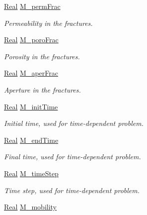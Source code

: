 \begin{DoxyCompactItemize}
\hyperlink{namespaceFVCode3D_a40c1f5588a248569d80aa5f867080e83}{Real} \hyperlink{classFVCode3D_1_1Data_a68f9fa864f076c053ae8ac8a3f86f7ea}{M\+\_\+perm\+Frac}
\begin{DoxyCompactList}\small\item\em Permeability in the fractures. \end{DoxyCompactList}\item 
\hyperlink{namespaceFVCode3D_a40c1f5588a248569d80aa5f867080e83}{Real} \hyperlink{classFVCode3D_1_1Data_af95b239d77dd531aaa59e3ac891dbd71}{M\+\_\+poro\+Frac}
\begin{DoxyCompactList}\small\item\em Porosity in the fractures. \end{DoxyCompactList}\item 
\hyperlink{namespaceFVCode3D_a40c1f5588a248569d80aa5f867080e83}{Real} \hyperlink{classFVCode3D_1_1Data_abf85bba32b4b3bdc3a392f193d4a145d}{M\+\_\+aper\+Frac}
\begin{DoxyCompactList}\small\item\em Aperture in the fractures. \end{DoxyCompactList}\item 
\hyperlink{namespaceFVCode3D_a40c1f5588a248569d80aa5f867080e83}{Real} \hyperlink{classFVCode3D_1_1Data_ab4a94e00bef44eb2195783ffa4682cf0}{M\+\_\+init\+Time}
\begin{DoxyCompactList}\small\item\em Initial time, used for time-\/dependent problem. \end{DoxyCompactList}\item 
\hyperlink{namespaceFVCode3D_a40c1f5588a248569d80aa5f867080e83}{Real} \hyperlink{classFVCode3D_1_1Data_ad0db1011dedc7485e6b4393c872506c0}{M\+\_\+end\+Time}
\begin{DoxyCompactList}\small\item\em Final time, used for time-\/dependent problem. \end{DoxyCompactList}\item 
\hyperlink{namespaceFVCode3D_a40c1f5588a248569d80aa5f867080e83}{Real} \hyperlink{classFVCode3D_1_1Data_a10e4abb864d8f95f89fd468a2a328d45}{M\+\_\+time\+Step}
\begin{DoxyCompactList}\small\item\em Time step, used for time-\/dependent problem. \end{DoxyCompactList}\item 
\hyperlink{namespaceFVCode3D_a40c1f5588a248569d80aa5f867080e83}{Real} \hyperlink{classFVCode3D_1_1Data_ace221dee0530a79694fbc1d2beca96ac}{M\+\_\+mobility}

\end{DoxyCompactItemize}
